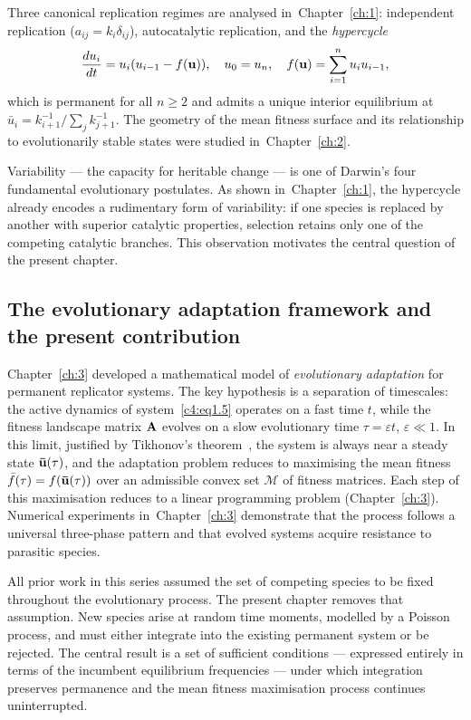 \documentclass[12pt]{report}
\theoremstyle{definition}
\theoremstyle{remark}
\begin{document}
Three canonical replication regimes are analysed in~Chapter~\ref{ch:1}: independent
replication ($a_{ij} = k_i\delta_{ij}$), autocatalytic replication, and the
\textit{hypercycle}
\begin{equation}
    \frac{du_i}{dt} = u_i(u_{i-1} - f({\bf u})), \quad u_0 = u_n,
    \quad f({\bf u}) = \sum_{i=1}^n u_i u_{i-1},
    \label{c4:eq1.8}
\end{equation}
which is permanent for all $n \geqslant 2$ and admits a unique interior
equilibrium at $\bar{u}_i = k_{i+1}^{-1}/\sum_{j} k_{j+1}^{-1}$.
The geometry of the mean fitness surface and its relationship to evolutionarily
stable states were studied in~Chapter~\ref{ch:2}.

Variability --- the capacity for heritable change --- is one of Darwin's four
fundamental evolutionary postulates. As shown in~Chapter~\ref{ch:1}, the
hypercycle already encodes a rudimentary form of variability: if one species
is replaced by another with superior catalytic properties, selection retains
only one of the competing catalytic branches. This observation motivates the
central question of the present chapter.

\subsection*{The evolutionary adaptation framework and the present contribution}

Chapter~\ref{ch:3} developed a mathematical model of \textit{evolutionary
adaptation} for permanent replicator systems. The key hypothesis is a separation
of timescales: the active dynamics of system~\eqref{c4:eq1.5} operates on a fast
time $t$, while the fitness landscape matrix ${\bf A}$ evolves on a slow
evolutionary time $\tau = \varepsilon t$, $\varepsilon \ll 1$. In this limit,
justified by Tikhonov's theorem~\cite{c4:Tihonov1948}, the system is always near
a steady state ${\bf \bar{u}}(\tau)$, and the adaptation problem reduces to
maximising the mean fitness $\bar{f}(\tau) = f({\bf \bar{u}}(\tau))$ over an
admissible convex set $\mathcal{M}$ of fitness matrices. Each step of this
maximisation reduces to a linear programming problem (Chapter~\ref{ch:3}).
Numerical experiments in~Chapter~\ref{ch:3} demonstrate that the process
follows a universal three-phase pattern and that evolved systems acquire
resistance to parasitic species.

All prior work in this series assumed the set of competing species to be fixed
throughout the evolutionary process. The present chapter removes that assumption.
New species arise at random time moments, modelled by a Poisson process, and
must either integrate into the existing permanent system or be rejected. The
central result is a set of sufficient conditions --- expressed entirely in
terms of the incumbent equilibrium frequencies --- under which integration
preserves permanence and the mean fitness maximisation process continues
uninterrupted.
\end{document}
